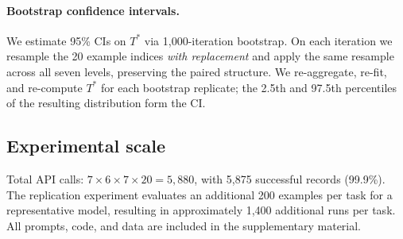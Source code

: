\paragraph{Bootstrap confidence intervals.}
We estimate 95\% CIs on $T^*$ via 1,000-iteration bootstrap.
On each iteration we resample the 20 example indices \emph{with replacement}
and apply the same resample across all seven levels, preserving the paired
structure.
We re-aggregate, re-fit, and re-compute $T^*$ for each bootstrap replicate;
the 2.5th and 97.5th percentiles of the resulting distribution form the CI.

\subsection{Experimental scale}
\label{sec:scale}

Total API calls: $7 \times 6 \times 7 \times 20 = 5{,}880$, with 5,875
successful records (99.9\%).
The replication experiment evaluates an additional 200 examples per task for
a representative model, resulting in approximately 1,400 additional runs per
task.
All prompts, code, and data are included in the supplementary material.
